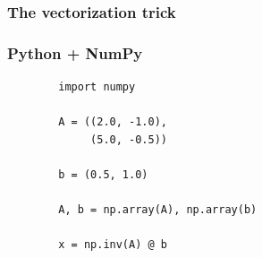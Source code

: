 \documentclass[
    xcolor={svgnames,dvipsnames},
    hyperref={colorlinks, citecolor=DeepPink4, linkcolor=DarkRed, urlcolor=DarkBlue}
    ]{beamer}  %
\newcommand{\1}{\mathbbm 1}
\begin{document}
\begin{frame}
    \frametitle{The vectorization trick}
    
    \begin{figure}
       \begin{center} %
       \end{center}
    \end{figure}

    
\end{frame}


\begin{frame}[fragile]
    \frametitle{Python + NumPy}


    \begin{verbatim}
        import numpy 

        A = ((2.0, -1.0),
             (5.0, -0.5))

        b = (0.5, 1.0)

        A, b = np.array(A), np.array(b)

        x = np.inv(A) @ b
    \end{verbatim}

\end{frame}
\end{document}

